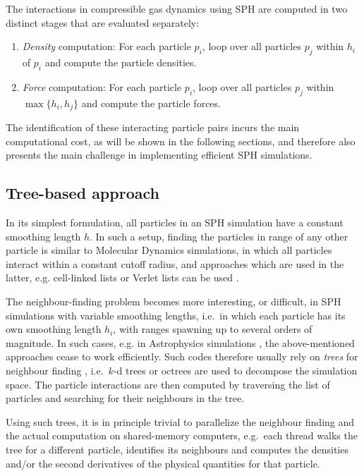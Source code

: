 \documentclass[a4paper,conference]{IEEEtran}
\begin{document}
The interactions in compressible gas dynamics using SPH
are computed in two distinct stages that are
evaluated separately:
\begin{enumerate}
    \item {\em Density} computation: For each particle $p_i$,
        loop over all particles $p_j$ within $h_i$ of $p_i$ and 
        compute the particle densities.
    \item {\em Force} computation: For each particle $p_i$,
        loop over all particles $p_j$
        within $\max\{h_i,h_j\}$ and compute the particle forces.
\end{enumerate}
The identification of these interacting particle pairs
incurs the main computational cost,
as will be shown in the following sections,
and therefore also presents the main challenge in implementing efficient
SPH simulations.


\subsection{Tree-based approach}

In its simplest formulation, all particles in an SPH simulation have
a constant smoothing length $h$.
In such a setup, finding the particles in range of any other particle
is similar to Molecular Dynamics simulations, in which all particles
interact within a constant cutoff radius, and approaches which are used
in the latter, e.g. cell-linked lists
\cite{ref:Allen1989} or Verlet lists \cite{ref:Verlet1967} can be used
\cite{ref:Dominguez2011,ref:Viccione2008}.

The neighbour-finding problem becomes more interesting, or difficult,
in SPH simulations with variable smoothing lengths, i.e.~in which
each particle has its own smoothing length $h_i$, with ranges spawning
up to several orders of magnitude.
In such cases, e.g. in Astrophysics simulations \cite{ref:Gingold1977},
the above-mentioned approaches cease to work efficiently.
Such codes therefore usually rely on {\em trees}
for neighbour finding \cite{ref:Hernquist1989,ref:Springel2005,ref:Wadsley2004},
i.e.~$k$-d trees \cite{ref:Bentley1975} or octrees \cite{ref:Meagher1982}
are used to decompose the simulation space. 
The particle interactions are then computed by traversing the list of
particles and searching for their neighbours in the tree.

Using such trees, it is in principle trivial to parallelize
the neighbour finding and the actual computation on shared-memory
computers,
e.g.~each thread walks the tree for a different particle,
identifies its neighbours and computes the densities and/or
the second derivatives of the physical quantities for that particle.
\end{document}
